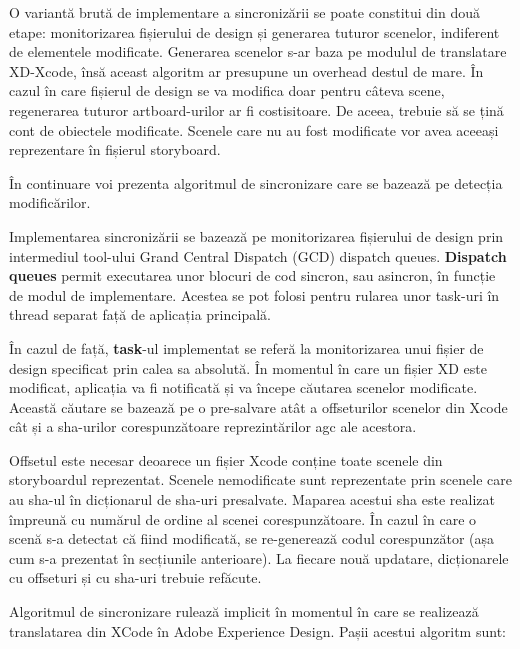 O variantă brută de implementare a sincronizării se poate constitui din două etape: monitorizarea fișierului de design și generarea tuturor scenelor, indiferent de elementele modificate. Generarea scenelor s-ar baza pe modulul de translatare XD-Xcode, însă aceast algoritm ar presupune un overhead destul de mare. În cazul în care fișierul de design se va modifica doar pentru câteva scene, regenerarea tuturor artboard-urilor ar fi costisitoare. De aceea, trebuie să se țină cont de obiectele modificate. Scenele care nu au fost modificate vor avea aceeași reprezentare în fișierul storyboard.

În continuare voi prezenta algoritmul de sincronizare care se bazează pe detecția modificărilor.

Implementarea sincronizării se bazează pe monitorizarea fișierului de design prin intermediul tool-ului Grand Central Dispatch (GCD) dispatch queues. \textbf{Dispatch queues} permit executarea unor blocuri de cod sincron, sau asincron, în funcție de modul de implementare. Acestea se pot folosi pentru rularea unor task-uri în thread separat față de aplicația principală. 

În cazul de față, \textbf{task}-ul implementat se referă la monitorizarea unui fișier de design specificat prin calea sa absolută. În momentul în care un fișier XD este modificat, aplicația va fi notificată și va începe căutarea scenelor modificate. 
Această căutare se bazează pe o pre-salvare atât a offseturilor scenelor din Xcode cât și a sha-urilor corespunzătoare reprezintărilor agc ale acestora. 

Offsetul este necesar deoarece un fișier Xcode conține toate scenele din storyboardul reprezentat.  Scenele nemodificate sunt reprezentate prin scenele care au sha-ul în dicționarul de sha-uri presalvate. Maparea acestui sha este realizat împreună cu numărul de ordine al scenei corespunzătoare. 
În cazul în care o scenă s-a detectat că fiind modificată, se re-generează codul corespunzător (așa cum s-a prezentat în secțiunile anterioare).  La fiecare nouă updatare, dicționarele cu offseturi și cu sha-uri trebuie refăcute.

Algoritmul de sincronizare rulează implicit în momentul în care se realizează translatarea din XCode în Adobe Experience Design. Pașii acestui algoritm sunt:

